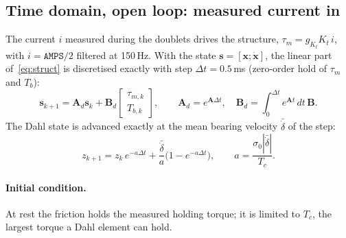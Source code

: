 \subsection{Time domain, open loop: measured current in}\label{sec:ol}
The current $i$ measured during the doublets drives the structure, $\tau_m=g_{K_t}K_t\,i$, with $i=\texttt{AMPS}/2$ filtered at 150\,Hz. With the state $\mathbf s=[\mathbf x;\dot{\mathbf x}]$, the linear part of~\eqref{eq:struct} is discretised exactly with step $\Delta t=0.5$\,ms (zero-order hold of $\tau_m$ and $T_b$):
\begin{equation}
\mathbf s_{k+1}=\mathbf A_d\mathbf s_k+\mathbf B_d\begin{bmatrix}\tau_{m,k}\\ T_{b,k}\end{bmatrix},\qquad \mathbf A_d=e^{\mathbf A\Delta t},\quad \mathbf B_d=\int_0^{\Delta t}e^{\mathbf A t}\,dt\,\mathbf B .
\end{equation}
The Dahl state is advanced exactly at the mean bearing velocity $\bar{\dot\delta}$ of the step:
\begin{equation}
z_{k+1}=z_k\,e^{-a\Delta t}+\frac{\bar{\dot\delta}}{a}\bigl(1-e^{-a\Delta t}\bigr),\qquad a=\frac{\sigma_0|\bar{\dot\delta}|}{T_c} .\label{eq:zupdate}
\end{equation}
\paragraph{Initial condition.} At rest the friction holds the measured holding torque; it is limited to $T_c$, the largest torque a Dahl element can hold.

